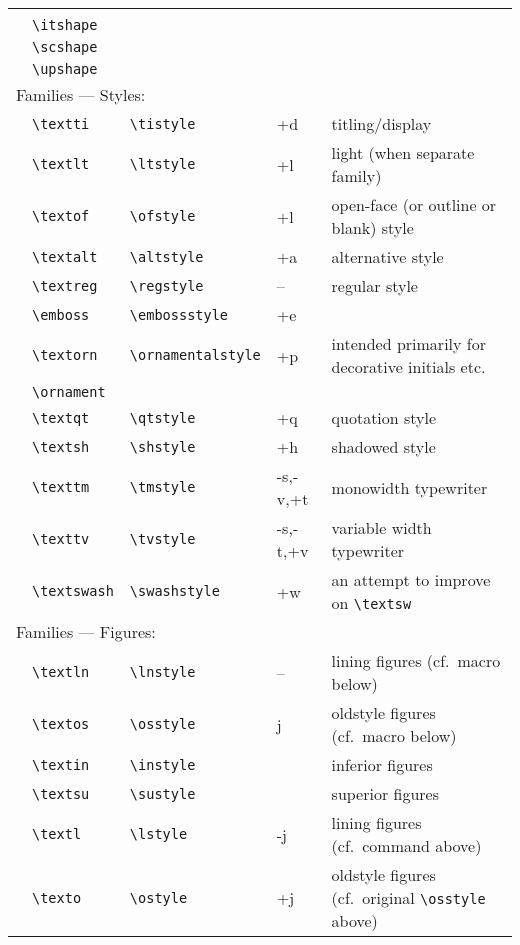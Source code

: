 \documentclass[pagesize=auto, fontsize=10pt, DIV=11]{scrartcl}
\newcommand*{\cs}[1]{\texttt{\textbackslash #1}}
\begin{document}
\begin{longtable}{lll>{\ttfamily}ll}
  \toprule\endhead
  \bottomrule\endfoot
  \multicolumn{5}{l}{\sffamily Standard macros redefined:}\\
  \cmidrule(lr){1-5}
  & \cs{itshape}\\
  & \cs{scshape}\\
  & \cs{upshape}\\
  \cmidrule(lr){1-5}
  \multicolumn{5}{l}{\sffamily Families --- Styles:}\\
  \cmidrule(lr){1-5}
  & \cs{textti} & \cs{tistyle} & +d & titling/display\\
  & \cs{textlt} & \cs{ltstyle} & +l & light (when separate family)\\
  & \cs{textof} & \cs{ofstyle} & +l &  open-face (or outline or blank) style\\
  & \cs{textalt} & \cs{altstyle} & +a &  alternative style\\
  & \cs{textreg} & \cs{regstyle} & -- &  regular style\\
  & \cs{emboss} & \cs{embossstyle} & +e & \\
  & \cs{textorn} & \cs{ornamentalstyle} & +p & intended primarily for decorative initials etc.\\
  & \cs{ornament} & \\
  & \cs{textqt} & \cs{qtstyle} & +q & quotation style\\
  & \cs{textsh} & \cs{shstyle} & +h & shadowed style\\
  & \cs{texttm} & \cs{tmstyle} & -s,-v,+t & monowidth typewriter\\
  & \cs{texttv} & \cs{tvstyle} & -s,-t,+v & variable width typewriter\\
  & \cs{textswash} & \cs{swashstyle} & +w & an attempt to improve on \cs{textsw}\\
  \cmidrule(lr){1-5}
  \multicolumn{5}{l}{\sffamily Families --- Figures:}\\
  \cmidrule(lr){1-5}
  & \cs{textln} & \cs{lnstyle} & -- &  lining figures (cf.~macro below)\\
  & \cs{textos} & \cs{osstyle} & j &  oldstyle figures (cf.~macro below)\\
  & \cs{textin} & \cs{instyle} & 0 &  inferior figures\\
  & \cs{textsu} & \cs{sustyle} & 1 &  superior figures\\
  & \cs{textl} & \cs{lstyle} & -j &  lining figures (cf.~command above)\\
  & \cs{texto} & \cs{ostyle} & +j &  oldstyle figures (cf.~original \cs{osstyle} above)\\

\end{longtable}
\end{document}
